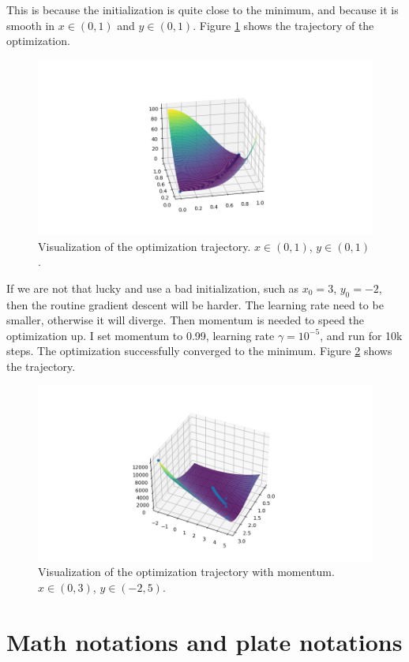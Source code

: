 This is because the initialization is quite close to the minimum,
and because it is smooth in $x \in (0,1)$ and $ y \in (0,1)$.
Figure \ref{fig:routine_gd} shows the trajectory of the optimization.

\begin{figure}[h]
    \includegraphics[width=.8\textwidth]{./routine_gd.png}
    \caption{Visualization of the optimization trajectory. $x \in (0,1)$, $y \in (0,1)$.}
    \label{fig:routine_gd}
\end{figure}

If we are not that lucky and use a bad initialization, such as $x_0 = 3$, $y_0 = -2$,
then the routine gradient descent will be harder.
The learning rate need to be smaller, otherwise it will diverge.
Then momentum is needed to speed the optimization up.
I set momentum to 0.99, learning rate $\gamma=10^{-5}$, and run for 10k steps.
The optimization successfully converged to the minimum.
Figure \ref{fig:gd_m} shows the trajectory.

\begin{figure}[h]
    \includegraphics[width=.8\textwidth]{./gd_m.png}
    \caption{Visualization of the optimization trajectory with momentum. $x \in (0,3)$, $y \in (-2,5)$.}
    \label{fig:gd_m}
\end{figure}

\newpage
\section{Math notations and plate notations}

